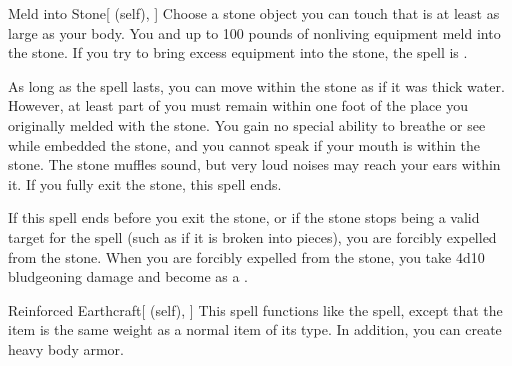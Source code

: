 \lowercase{\hypertarget{spell:Meld into Stone}{}}\label{spell:Meld into Stone}
\begin{attuneability}[\nth{2}]{\hypertarget{spell:Meld into Stone}{Meld into Stone}}[ (self), ]
Choose a stone object you can touch that is at least as large as your body.
You and up to 100 pounds of nonliving equipment meld into the stone.
If you try to bring excess equipment into the stone, the spell is .

As long as the spell lasts, you can move within the stone as if it was thick water.
However, at least part of you must remain within one foot of the place you originally melded with the stone.
You gain no special ability to breathe or see while embedded the stone, and you cannot speak if your mouth is within the stone.
The stone muffles sound, but very loud noises may reach your ears within it.
If you fully exit the stone, this spell ends.

If this spell ends before you exit the stone, or if the stone stops being a valid target for the spell (such as if it is broken into pieces), you are forcibly expelled from the stone.
When you are forcibly expelled from the stone, you take 4d10 bludgeoning damage and become  as a .
\end{attuneability}
\vspace{0.25em}



\lowercase{\hypertarget{spell:Reinforced Earthcraft}{}}\label{spell:Reinforced Earthcraft}
\begin{attuneability}[\nth{2}]{\hypertarget{spell:Reinforced Earthcraft}{Reinforced Earthcraft}}[ (self), ]
This spell functions like the  spell, except that the item is the same weight as a normal item of its type.
In addition, you can create heavy body armor.
\end{attuneability}
\vspace{0.25em}



